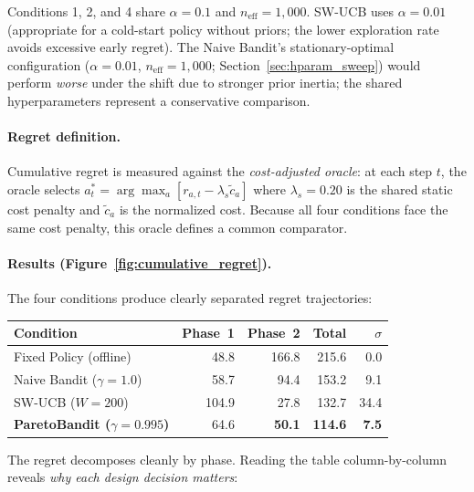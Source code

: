 \noindent
Conditions 1, 2, and 4 share $\alpha{=}0.1$ and
$n_{\mathrm{eff}}{=}1{,}000$.
SW-UCB uses $\alpha{=}0.01$ (appropriate for a cold-start
policy without priors; the lower exploration rate avoids
excessive early regret).
The Naive Bandit's stationary-optimal configuration
($\alpha{=}0.01$, $n_{\mathrm{eff}}{=}1{,}000$;
Section~\ref{sec:hparam_sweep}) would perform \emph{worse}
under the shift due to stronger prior inertia; the shared
hyperparameters represent a conservative comparison.

\paragraph{Regret definition.}
Cumulative regret is measured against the \emph{cost-adjusted oracle}:
at each step $t$, the oracle selects
$a^*_t = \arg\max_a [r_{a,t} - \lambda_s \tilde{c}_a]$
where $\lambda_s{=}0.20$ is the shared static cost penalty
and $\tilde{c}_a$ is the normalized cost.
Because all four conditions face the same cost penalty, this
oracle defines a common comparator.

\paragraph{Results (Figure~\ref{fig:cumulative_regret}).}
The four conditions produce clearly separated regret trajectories:

\begin{center}
\small
\begin{tabular}{lrrrr}
\toprule
Condition & Phase~1 & Phase~2 & Total & $\sigma$ \\
\midrule
Fixed Policy (offline) & 48.8 & 166.8 & 215.6 & 0.0 \\
Naive Bandit ($\gamma{=}1.0$) & 58.7 & 94.4 & 153.2 & 9.1 \\
SW-UCB ($W{=}200$) & 104.9 & 27.8 & 132.7 & 34.4 \\
\textbf{ParetoBandit ($\gamma{=}0.995$)} & 64.6 & \textbf{50.1} & \textbf{114.6} & \textbf{7.5} \\
\bottomrule
\end{tabular}
\end{center}

\noindent
The regret decomposes cleanly by phase.  Reading the table
column-by-column reveals \emph{why each design decision matters}:

